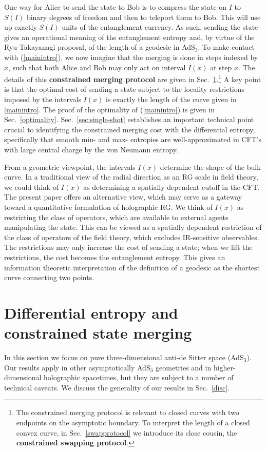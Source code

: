 \documentclass[12pt]{article}
\begin{document}
One way for Alice to send the state to Bob is to compress the state on $I$ to $S(I)$ binary degrees of freedom \cite{schumacher} and then to teleport them \cite{teleport} to Bob. This will use up exactly $S(I)$ units of the entanglement currency. As such, sending the state gives an operational meaning of the entanglement entropy and, by virtue of the Ryu-Takayanagi proposal, of the length of a geodesic in AdS$_3$. To make contact with (\ref{mainintro}), we now imagine that the merging is done in steps indexed by $x$, such that both Alice and Bob may only act on interval $I(x)$ at step $x$. The details of this {\bf constrained merging protocol} are given in Sec.~\ref{diff-entropy}.\footnote{The constrained merging protocol is relevant to closed curves with two endpoints on the asymptotic boundary. To interpret the length of a closed convex curve, in Sec.~\ref{swapprotocol} we introduce its close cousin, the {\bf constrained swapping protocol}.} A key point is that the optimal cost of sending a state subject to the locality restrictions imposed by the intervals $I(x)$ is exactly the length of the curve given in \eqref{mainintro}. The proof of the optimality of (\ref{mainintro}) is given in Sec.~\ref{optimality}. Sec.~\ref{sec:single-shot} establishes an important technical point crucial to identifying the constrained merging cost with the differential entropy, specifically that smooth min- and max- entropies are well-approximated in CFT's with large central charge by the von Neumann entropy.

From a geometric viewpoint, the intervals $I(x)$ determine the shape of the bulk curve. In a traditional view of the radial direction as an RG scale in field theory, we could think of $I(x)$ as determining a spatially dependent cutoff in the CFT. The present paper offers an alternative view, which may serve as a gateway toward a quantitative formulation of holographic RG. We think of $I(x)$ as restricting the class of operators, which are available to external agents manipulating the state. This can be viewed as a spatially dependent restriction of the class of operators of the field theory, which excludes IR-sensitive observables. The restrictions may only increase the cost of sending a state; when we lift the restrictions, the cost becomes the entanglement entropy. This gives an information theoretic interpretation of the definition of a geodesic as the shortest curve connecting two points.

\section{Differential entropy and constrained state merging}
\label{diff-entropy}
In this section we focus on pure three-dimensional anti-de Sitter space (AdS$_3$). Our results apply in other asymptotically AdS$_3$ geometries and in higher-dimensional holographic spacetimes, but they are subject to a number of technical caveats. We discuss the generality of our results in Sec.~\ref{disc}.
\end{document}
